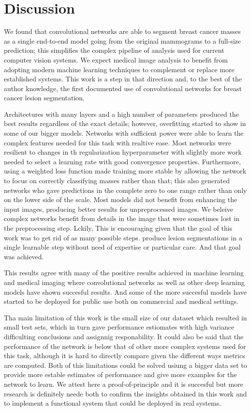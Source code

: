 \section{Discussion}
We found that convolutional networks are able to segment breast cancer masses as a single end-to-end model going from the original mammograms to a full-size prediction; this simplifies the complex pipeline of analysis used for current computer vision systems. We expect medical image analysis to benefit from adopting modern machine learning techniques to complement or replace more established systems. This work is a step in that direction and, to the best of the author knowledge, the first documented use of convolutional networks for breast cancer lesion segmentation.

Architectures with many layers and a high number of parameters produced the best results regardless of the exact details; however, overfitting started to show in some of our bigger models. Networks with sufficient power were able to learn the complex features needed for this task with realtive ease. Most networks were resilient to changes in th regularization hyperparameter with slightly more work needed to select a learning rate with good convergence properties. Furthermore, using a weighted loss function made training more stable by allowing the network to focus on correctly classifying masses rather than that; this also generated networks who gave predictions in  the complete zero to one range rather than only on the lower side of the scale. Most models did not benefit from enhancing the input images, producing better results for unpreprocessed images. We beleive complex networks benefit from details in the image that were sometimes lost in the preprocessing step. Lckily, This is encouraging given that the goal of this work was to get rid of as many possible steps. produce lesion segmentations in a single learnable step without need of expertise or particular care. And that goal was achieved.

This results agree with many of the positive results achieved in machine learning and medical imaging where convolutional networks as well as other deep learning models have shown succesful results. And some of the more succesful models have started to be deployed for public use both on commercial and medical settings.

Tha main limitation of this work is the small size of our dataset which resulted in small test sets, which in turn gave performance estiomates with high variance difficulting conclusions and assignnig responability. It could also be said that the performance of the network is below that of other more complex systems used for this task, although it is hard to directly compare given the different ways metrics are computed. Both of this limitations could be solved usiung a bigger data set to provide more estable estimates of performance and give more examples for the network to learn. We attest here a proof-of-principle and it is succesful but more research is definitely neede both to confirm the insights obtained in this work and to implement a functional system that could be deployed in real systems. %


